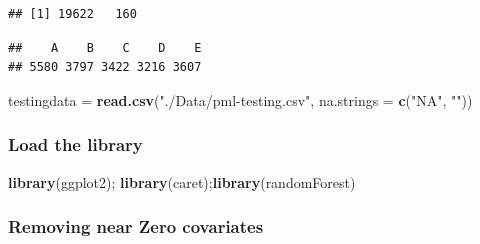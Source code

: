 \documentclass[]{article}
\newenvironment{Shaded}{\begin{snugshade}}{\end{snugshade}}
\newcommand{\KeywordTok}[1]{\textcolor[rgb]{0.13,0.29,0.53}{\textbf{{#1}}}}
\newcommand{\DataTypeTok}[1]{\textcolor[rgb]{0.13,0.29,0.53}{{#1}}}
\newcommand{\StringTok}[1]{\textcolor[rgb]{0.31,0.60,0.02}{{#1}}}
\newcommand{\OtherTok}[1]{\textcolor[rgb]{0.56,0.35,0.01}{{#1}}}
\newcommand{\NormalTok}[1]{{#1}}
\begin{document}
\begin{Shaded}
\end{Shaded}

\begin{verbatim}
## [1] 19622   160
\end{verbatim}

\begin{verbatim}
##    A    B    C    D    E 
## 5580 3797 3422 3216 3607
\end{verbatim}

\begin{Shaded}
\begin{Highlighting}[]
\NormalTok{testingdata =}\StringTok{ }\KeywordTok{read.csv}\NormalTok{(}\StringTok{"./Data/pml-testing.csv"}\NormalTok{, }\DataTypeTok{na.strings =} \KeywordTok{c}\NormalTok{(}\StringTok{"NA"}\NormalTok{, }\StringTok{""}\NormalTok{))}
\end{Highlighting}
\end{Shaded}

\subsubsection{Load the library}\label{load-the-library}

\begin{Shaded}
\begin{Highlighting}[]
\KeywordTok{library}\NormalTok{(ggplot2); }\KeywordTok{library}\NormalTok{(caret);}\KeywordTok{library}\NormalTok{(randomForest)}
\end{Highlighting}
\end{Shaded}

\subsubsection{Removing near Zero
covariates}\label{removing-near-zero-covariates}

\begin{Shaded}
\end{Shaded}
\end{document}
